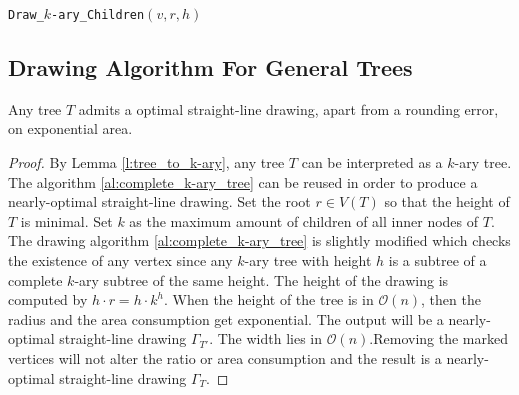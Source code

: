 \begin{algorithm}[H]
	\caption{\texttt{Draw\_$k$-ary\_Children}$(v,r,h)$}
\end{algorithm}

\subsection{Drawing Algorithm For General Trees}

\begin{theorem}
	Any tree $T$ admits a optimal straight-line drawing, apart from a rounding error, on exponential area.
\end{theorem}
\begin{proof}
	By Lemma \ref{l:tree_to_k-ary}, any tree $T$ can be interpreted as a $k$-ary tree. The algorithm \ref{al:complete_k-ary_tree} can be reused in order to produce a nearly-optimal straight-line drawing. Set the root $r \in V(T)$ so that the height of $T$ is minimal. Set $k$ as the maximum amount of children of all inner nodes of $T$. The drawing algorithm \ref{al:complete_k-ary_tree} is slightly modified which checks the existence of any vertex since any $k$-ary tree with height $h$ is a subtree of a complete $k$-ary subtree of the same height. The height of the drawing is computed by $h\cdot r = h\cdot k^h$. When the height of the tree is in $\mathcal{O}(n)$, then the radius and the area consumption get exponential. The output will be a nearly-optimal straight-line drawing $\Gamma_{T'}$. The width lies in $\mathcal{O}(n). $Removing the marked vertices will not alter the ratio or area consumption and the result is a nearly-optimal straight-line drawing $\Gamma_T$.
\end{proof}

